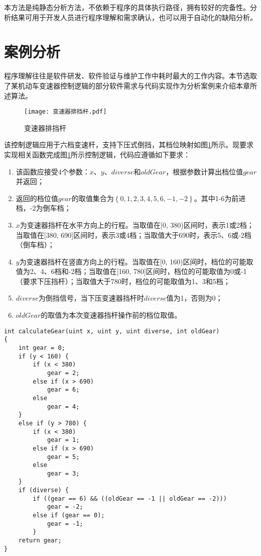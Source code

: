 本方法是纯静态分析方法，不依赖于程序的具体执行路径，拥有较好的完备性。分析结果可用于开发人员进行程序理解和需求确认，也可以用于自动化的缺陷分析。

\section{案例分析}
\label{sec:值流图案例分析}

程序理解往往是软件研发、软件验证与维护工作中耗时最大的工作内容。本节选取了某机动车变速器控制逻辑的部分软件需求与代码实现作为分析案例来介绍本章所述算法。

\begin{figure}[H]
	\centering
	\texttt{[image: 变速器排挡杆.pdf]}
	\caption{变速器排挡杆}
	\label{fig:gearLever}
\end{figure}

该控制逻辑应用于六档变速杆，支持下压式倒挡，其档位映射如图\ref{fig:gearLever}所示。现要求实现相关函数完成图\ref{fig:gearLever}所示控制逻辑，代码应遵循如下要求：

\begin{enumerate}
	\item 该函数应接受4个参数：$ x $、$ y $、$ diverse $和$ oldGear $，根据参数计算出档位值$ gear $并返回；
	\item 返回的档位值$ gear $的取值集合为$\left\{0, 1, 2, 3, 4, 5, 6, -1, -2\right\}$。其中1-6为前进档，-2为倒车档；
	\item $ x $为变速器挡杆在水平方向上的行程。当取值在[0, 380)区间时，表示1或2档；当取值在[380, 690]区间时，表示3或4档；当取值大于690时，表示5、6或-2档（倒车档）；
	\item  $ y $为变速器挡杆在竖直方向上的行程。当取值在[0, 160)区间时，档位的可能取值为2、4、6档和-2档；当取值在[160, 780]区间时，档位的可能取值为0或-1（要求下压挡杆）；当取值大于780时，档位的可能取值为1、3和5档；
	\item $ diverse $为倒挡信号，当下压变速器挡杆时$ diverse $值为1，否则为0；
	\item $ oldGear $的取值为本次变速器挡杆操作前的档位取值。
\end{enumerate}

\begin{lstlisting}[label=code:gearLever,caption=变速器档位控制的一个函数实现]
int calculateGear(uint x, uint y, uint diverse, int oldGear)
{
	int gear = 0;
	if (y < 160) {
		if (x < 380)
			gear = 2;
		else if (x > 690)
			gear = 6;
		else
			gear = 4;
	}
	else if (y > 780) {
		if (x < 380)
			gear = 1;
		else if (x > 690)
			gear = 5;
		else
			gear = 3;
	}
	if (diverse) {
		if ((gear == 6) && ((oldGear == -1 || oldGear == -2)))
			gear = -2;
		else if (gear == 0);
			gear = -1;
		}
	return gear;
}
\end{lstlisting}

